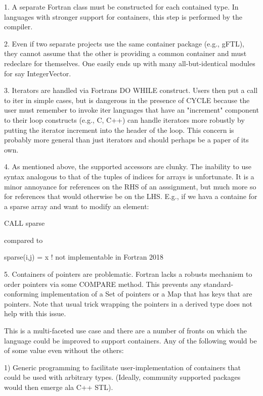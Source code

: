 \documentclass{article}
\begin{document}
1. A separate Fortran class must be constructed for each contained
   type.  In languages with stronger support for containers, this step
   is performed by the compiler.

2. Even if two separate projects use the same container package (e.g.,
   gFTL), they cannot assume that the other is providing a common
   container and must redeclare for themselves.  One easily ends up
   with many all-but-identical modules for say IntegerVector.

3. Iterators are handled via Fortrans DO WHILE construct.  Users then
   put a call to iter%
   in simple cases, but is dangerous in the presence of CYCLE because
   the user must remember to invoke iter%
   languages that have an "increment" component to their loop
   constructs (e.g., C, C++) can handle iterators more robustly by
   putting the iterator increment into the header of the loop.  This
   concern is probably more general than just iterators and should
   perhaps be a paper of its own.

4. As mentioned above, the supported accessors are clunky.  The
   inability to use syntax analogous to that of the tuples of indices
   for arrays is unfortunate.  It is a minor annoyance for references
   on the RHS of an asssignment, but much more so for references that
   would otherwise be on the LHS.  E.g., if we hava a containe for a
   sparse array and want to modify an element:

      CALL sparse%

   compared to

      sparse(i,j) = x  ! not implementable in Fortran 2018

5. Containers of pointers are problematic.  Fortran lacks a robusts
   mechanism to order pointers via some COMPARE method.  This prevents
   any standard-conforming implementation of a Set of pointers or a
   Map that has keys that are pointers.  Note that usual trick wrapping the
   pointers in a derived type does not help with this issue.


This is a multi-faceted use case and there are a number of fronts on
which the language could be improved to support containers.  Any of
the following would be of some value even without the others:

1) Generic programming to facilitate user-implementation of
   containers that could be used with arbitrary types.  (Ideally,
   community supported packages would then emerge ala C++ STL).
\end{document}
